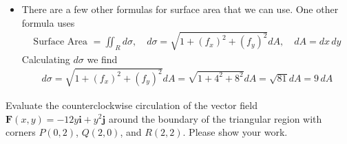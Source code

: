 {\begin{itemize}
\begin{align}
        &=  10\int_0^2 (y^2 +y) \,dy \\
        &=  10 \left( \left. y^3/3 + \frac{y^2}{2} \right) \right|_0^2  \\
        &=  10 \left(\frac{8}{3} + 2\right) \\
        &= \frac{140}{3}
    \end{align}   
    \item There are a few other formulas for surface area that we can use. One other formula uses
    \begin{align}
        \text{Surface Area } = \iint_R d\sigma, \quad d\sigma = \sqrt{1+(f_x)^2 + (f_y)^2}dA, \quad dA = dx\,dy
    \end{align}
    Calculating $d\sigma$ we find
    \begin{align}
        d\sigma = \sqrt{1+(f_x)^2 + (f_y)^2} dA= \sqrt{1+4^2+8^2} dA= \sqrt{81} dA= 9\, dA
    \end{align}
    \end{itemize}
    
    } 
   \else
   \fi
\fi



\ifnum {}

    \question[4] Evaluate the counterclockwise circulation of the vector field $\mathbf F (x,y) = -12y\mathbf i + y^2 \mathbf j$ around the boundary of the triangular region with corners $P(0,2)$, $Q(2,0)$, and $R(2,2)$.  Please show your work. 
    
